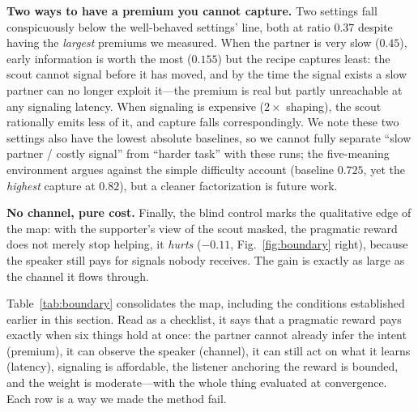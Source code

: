 \documentclass{article}
\begin{document}
\textbf{Two ways to have a premium you cannot capture.} Two settings fall conspicuously below the well-behaved settings' line, both at ratio $0.37$ despite having the \emph{largest} premiums we measured. When the partner is very slow ($0.45$), early information is worth the most ($0.155$) but the recipe captures least: the scout cannot signal before it has moved, and by the time the signal exists a slow partner can no longer exploit it---the premium is real but partly unreachable at any signaling latency. When signaling is expensive ($2\times$ shaping), the scout rationally emits less of it, and capture falls correspondingly. We note these two settings also have the lowest absolute baselines, so we cannot fully separate ``slow partner / costly signal'' from ``harder task'' with these runs; the five-meaning environment argues against the simple difficulty account (baseline $0.725$, yet the \emph{highest} capture at $0.82$), but a cleaner factorization is future work.

\textbf{No channel, pure cost.} Finally, the blind control marks the qualitative edge of the map: with the supporter's view of the scout masked, the pragmatic reward does not merely stop helping, it \emph{hurts} ($-0.11$, Fig.~\ref{fig:boundary} right), because the speaker still pays for signals nobody receives. The gain is exactly as large as the channel it flows through.

Table~\ref{tab:boundary} consolidates the map, including the conditions established earlier in this section. Read as a checklist, it says that a pragmatic reward pays exactly when six things hold at once: the partner cannot already infer the intent (premium), it can observe the speaker (channel), it can still act on what it learns (latency), signaling is affordable, the listener anchoring the reward is bounded, and the weight is moderate---with the whole thing evaluated at convergence. Each row is a way we made the method fail.
\end{document}
